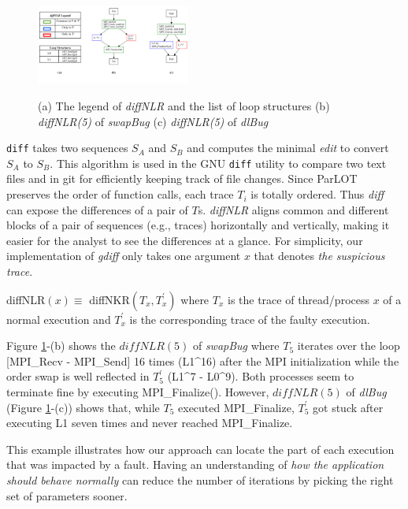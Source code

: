 \begin{figure}[]
\centering
\caption{(a) The legend of \textit{diffNLR} and the list of loop structures (b) \textit{diffNLR(5)} of \textit{swapBug} (c) \textit{diffNLR(5)} of \textit{dlBug}}
\includegraphics[width=0.45\textwidth]{figs/sampleGdiff.png}
\label{fig.gdiffs}
\end{figure}


\texttt{diff} takes two sequences $S_A$ and $S_B$ and computes the minimal \textit{edit} to convert $S_A$ to $S_B$. This algorithm is used in the GNU \texttt{diff} utility to compare two text files and in git for efficiently keeping track of file changes.
Since ParLOT preserves the order of function calls, each trace $T_i$ is totally ordered. Thus \textit{diff} can expose the differences of a pair of $T$s. \textit{diffNLR} aligns common and different blocks of a pair of sequences (e.g., traces) horizontally and vertically, making it easier for the analyst to see the differences at a glance.
For simplicity, our implementation of \textit{gdiff} only takes one argument $x$ that denotes \textit{the suspicious trace}.

diffNLR$(x) \equiv $ diffNKR$(T_x,T_x^\prime)$
%
where $T_x$ is the trace of thread/process $x$ of a normal execution and $T^\prime_x$ is the corresponding trace of the faulty execution.

Figure \ref{fig.gdiffs}-(b) shows the $diffNLR(5)$ of \textit{swapBug} where $T_5$ iterates over the loop [MPI\_Recv - MPI\_Send] 16 times (L1\^{}16) after the MPI initialization while the order swap is well reflected in $T_5^\prime$ (L1\^{}7 - L0\^{}9). Both processes seem to terminate fine by executing MPI\_Finalize(). 
However, $diffNLR(5)$ of \textit{dlBug} (Figure \ref{fig.gdiffs}-(c)) shows that, while $T_5$ executed MPI\_Finalize, $T_5^\prime$ got stuck after executing L1 seven times and never reached MPI\_Finalize.

This example illustrates how our approach can locate the part of each execution that was impacted by a fault. Having an understanding of \textit{how the application should behave normally} can reduce the number of iterations by picking the right set of parameters sooner. 








